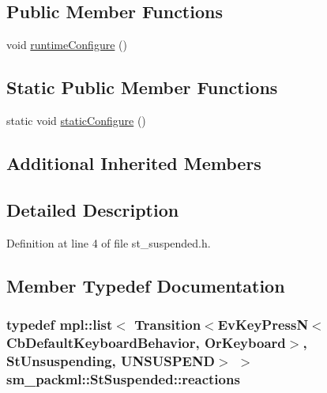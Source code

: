 \subsection*{Public Member Functions}
\begin{DoxyCompactItemize}
\item 
void \hyperlink{structsm__packml_1_1StSuspended_af9c5fd3ed5e46c07d956b40ea0c33bb3}{runtime\+Configure} ()
\end{DoxyCompactItemize}
\subsection*{Static Public Member Functions}
\begin{DoxyCompactItemize}
\item 
static void \hyperlink{structsm__packml_1_1StSuspended_a0da2fc9a8302e89f67aa6b4d7e38a2fd}{static\+Configure} ()
\end{DoxyCompactItemize}
\subsection*{Additional Inherited Members}


\subsection{Detailed Description}


Definition at line 4 of file st\+\_\+suspended.\+h.



\subsection{Member Typedef Documentation}
\subsubsection[{\texorpdfstring{reactions}{reactions}}]{\setlength{\rightskip}{0pt plus 5cm}typedef mpl\+::list$<$ Transition$<$Ev\+Key\+PressN$<$Cb\+Default\+Keyboard\+Behavior, {\bf Or\+Keyboard}$>$, {\bf St\+Unsuspending}, {\bf U\+N\+S\+U\+S\+P\+E\+ND}$>$ $>$ {\bf sm\+\_\+packml\+::\+St\+Suspended\+::reactions}}\hypertarget{structsm__packml_1_1StSuspended_ac6c9b0d11341ea90eee463202540ceb9}{}\label{structsm__packml_1_1StSuspended_ac6c9b0d11341ea90eee463202540ceb9}


